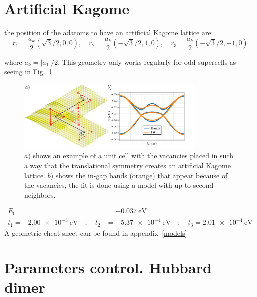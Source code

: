 \section{Artificial Kagome}
the position of the adatoms to have an artificial Kagome lattice are:
\begin{equation}
  r_1 = \frac{a_k}{2}\left(\sqrt{3}/2,  0 ,0\right),\quad
  r_2 = \frac{a_k}{2}\left(-\sqrt{3}/2,1,0\right),\quad
  r_3 = \frac{a_k}{2}\left(-\sqrt{3}/2,-1,0\right)
\end{equation}

where $a_k = |a_1|/2$. This geometry only works regularly for odd supercells as seeing in Fig.~\ref{kagome}


\begin{figure}[h!]
  \centering
  \includegraphics[width=0.8\textwidth]{artlat/fig/kagome_bands.pdf}
  \vspace{-5pt}
  \caption{$a)$ shows an example of a unit cell with the vacancies placed in such a way that the translational symmetry creates an artificial Kagome lattice. $b)$ shows the in-gap bands (orange) that appear because of the vacancies, the fit is done using a model with up to second neighbors.}
  \label{kagome}
\end{figure}
\FloatBarrier
\begin{equation}
\begin{split}
  E_0 &= \SI{-0.037}{\eV}\\
  t_1 = \SI{-2.00e-3}{\eV} \quad;\quad
  t_2 &= \SI{-5.37e-4}{\eV} \quad;\quad
  t_3 = \SI{2.01e-4}{\eV}
\end{split}
\end{equation}
A geometric cheat sheet can be found in appendix~\ref{models}





\section{Parameters control. Hubbard dimer}

